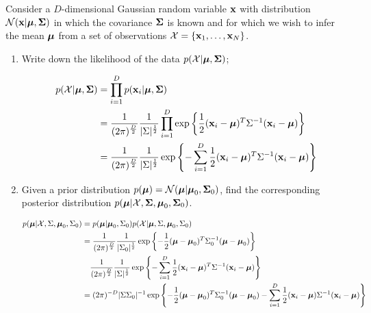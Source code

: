 \documentclass{amsmlaj}
\begin{document}
\begin{problem}
Consider a $D$-dimensional Gaussian random variable $\bm{\mathbf{x}}$ with
distribution $\mathcal{N}(\bm{\mathbf{x}}|\bm{\mathbf{\mu}},\bm{\mathbf{\Sigma}})$ in which the
covariance $\bm{\mathbf{\Sigma}}$ is known and for which we wish to infer the
mean $\bm{\mathbf{\mu}}$ from a set of observations
$\mathcal{X}=\{\bm{\mathbf{x}}_1,\dotsc,\bm{\mathbf{x}}_N\}$. 
\begin{enumerate}
\item Write down the likelihood of the data
				$p(\mathcal{X}|\bm{\mathbf{\mu}},\bm{\mathbf{\Sigma}})$;

	\begin{equation}
		\begin{split}
			p(\mathcal{X}|\bm{\mathbf{\mu}},\bm{\mathbf{\Sigma}})&=
			\prod_{i=1}^D p(\bm{\mathbf{x}}_i|\bm{\mathbf{\mu}},\bm{\mathbf{\Sigma}}) \\
			&=\frac{1}{(2\pi)^{\frac{D}{2}}}\frac{1}{|\Sigma|^\frac{1}{2}}\prod_{i=1}^D
			\exp\left\{ \frac{1}{2}(\bm{\mathbf{x}}_i-\bm{\mathbf{\mu}})^T\Sigma^{-1}(\bm{\mathbf{x}}_i-\bm{\mathbf{\mu}})
			\right\} \\
			&=\frac{1}{(2\pi)^{\frac{D}{2}}}\frac{1}{|\Sigma|^\frac{1}{2}}\exp\left\{
				-\sum_{i=1}^D\frac{1}{2}(\bm{\mathbf{x}}_i-\bm{\mathbf{\mu}})^T\Sigma^{-1}(\bm{\mathbf{x}}_i-\bm{\mathbf{\mu}})
			\right\}
		\end{split}
	\end{equation}

\item Given a prior distribution
				$p(\bm{\mathbf{\mu}})=\mathcal{N}(\bm{\mathbf{\mu}}|\bm{\mathbf{\mu}}_0,\bm{\mathbf{\Sigma}}_0)$,
				find the corresponding posterior distribution
				$p(\bm{\mathbf{\mu}}|\mathcal{X},\bm{\mathbf{\Sigma}},\bm{\mathbf{\mu}}_0,\bm{\mathbf{\Sigma}}_0)$.

	\begin{equation}
		\begin{split}
			p(\bm{\mathbf{\mu}}|\mathcal{X},\Sigma,\bm{\mathbf{\mu}}_0,\Sigma_0)&=
			p(\bm{\mathbf{\mu}}|\bm{\mathbf{\mu}}_0,\Sigma_0)p(\mathcal{X}|\bm{\mathbf{\mu}},\Sigma,\bm{\mathbf{\mu}}_0,\Sigma_0) \\
			&=\frac{1}{(2\pi)^{\frac{D}{2}}}\frac{1}{|\Sigma_0|^{\frac{1}{2}}}\exp\left\{
				-\frac{1}{2}(\bm{\mathbf{\mu}}-\bm{\mathbf{\mu}}_0)^T\Sigma_0^{-1}(\bm{\mathbf{\mu}}-\bm{\mathbf{\mu}}_0)
			\right\} \\
			&\quad\frac{1}{(2\pi)^{\frac{D}{2}}}\frac{1}{|\Sigma|^\frac{1}{2}}\exp\left\{
				-\sum_{i=1}^D\frac{1}{2}(\bm{\mathbf{x}}_i-\bm{\mathbf{\mu}})^T\Sigma^{-1}(\bm{\mathbf{x}}_i-\bm{\mathbf{\mu}})
			\right\} \\
			&=(2\pi)^{-D}|\Sigma\Sigma_0|^{-1}\exp\left\{
				-\frac{1}{2}(\bm{\mathbf{\mu}}-\bm{\mathbf{\mu}}_0)^T\Sigma_0^{-1}(\bm{\mathbf{\mu}}-\bm{\mathbf{\mu}}_0)
				-\sum_{i=1}^D\frac{1}{2}(\bm{\mathbf{x}}_i-\bm{\mathbf{\mu}})\Sigma^{-1}(\bm{\mathbf{x}}_i-\bm{\mathbf{\mu}})
			\right\}
		\end{split}
	\end{equation}


\end{enumerate}
\end{problem}
\end{document}
